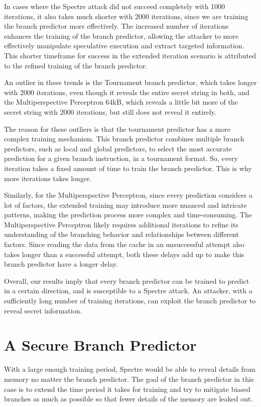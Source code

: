 \documentclass[twocolumn,showpacs,%
  nofootinbib,aps,superscriptaddress,%
  eqsecnum,prd,notitlepage,showkeys,10pt]{revtex4-1}
\begin{document}
In cases where the Spectre attack did not succeed completely with 1000 iterations, it also takes much shorter with 2000 iterations, since we are training the branch predictor more effectively. The increased number of iterations enhances the training of the branch predictor, allowing the attacker to more effectively manipulate speculative execution and extract targeted information. This shorter timeframe for success in the extended iteration scenario is attributed to the refined training of the branch predictor.

An outlier in these trends is the Tournament branch predictor, which takes longer with 2000 iterations, even though it reveals the entire secret string in both, and the Multiperspective Perceptron 64kB, which reveals a little bit more of the secret string with 2000 iterations, but still does not reveal it entirely. 

The reason for these outliers is that the tournament predictor has a more complex training mechanism. This branch predictor combines multiple branch predictors, such as local and global predictors, to select the most accurate prediction for a given branch instruction, in a tournament format. So, every iteration takes a fixed amount of time to train the branch predictor. This is why more iterations takes longer.

Similarly, for the Multiperspective Perceptron, since every prediction considers a lot of factors, the extended training may introduce more nuanced and intricate patterns, making the prediction process more complex and time-consuming. The Multiperspective Perceptron likely requires additional iterations to refine its understanding of the branching behavior and relationships between different factors. Since reading the data from the cache in an unsuccessful attempt also takes longer than a successful attempt, both these delays add up to make this branch predictor have a longer delay.

Overall, our results imply that every branch predictor can be trained to predict in a certain direction, and is susceptible to a Spectre attack. An attacker, with a sufficiently long number of training iterations, can exploit the branch predictor to reveal secret information.

\section{A Secure Branch Predictor}

With a large enough training period, Spectre would be able to reveal details from memory no matter the branch predictor. The goal of the branch predictor in this case is to extend the time period it takes for training and try to mitigate biased branches as much as possible so that fewer details of the memory are leaked out.
\end{document}
